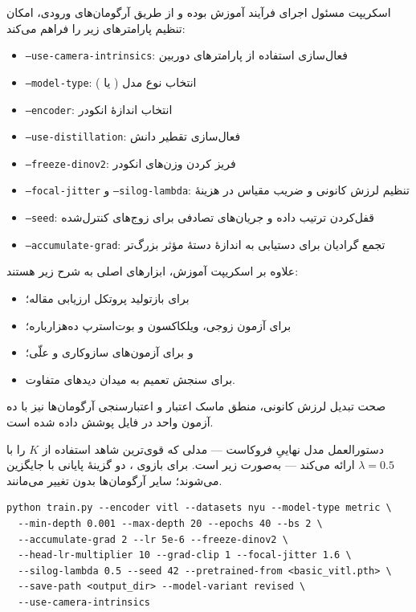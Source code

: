 اسکریپت  مسئول اجرای فرآیند آموزش بوده و از طریق آرگومان‌های ورودی، امکان تنظیم پارامترهای زیر را فراهم می‌کند:

\begin{itemize}
    \item \texttt{--use-camera-intrinsics}: فعال‌سازی استفاده از پارامترهای دوربین
    \item \texttt{--model-type}: انتخاب نوع مدل ( یا )
    \item \texttt{--encoder}: انتخاب اندازهٔ انکودر 
    \item \texttt{--use-distillation}: فعال‌سازی تقطیر دانش
    \item \texttt{--freeze-dinov2}: فریز کردن وزن‌های انکودر
    \item \texttt{--focal-jitter} و \texttt{--silog-lambda}: تنظیم لرزش کانونی و ضریب مقیاس در هزینهٔ 
    \item \texttt{--seed}: قفل‌کردن ترتیب داده و جریان‌های تصادفی برای زوج‌های کنترل‌شده
    \item \texttt{--accumulate-grad}: تجمع گرادیان برای دستیابی به اندازهٔ دستهٔ مؤثر بزرگ‌تر
\end{itemize}

علاوه بر اسکریپت آموزش، ابزارهای اصلی به شرح زیر هستند:
\begin{itemize}
    \item {} برای بازتولید پروتکل ارزیابی مقاله؛
    \item {} برای آزمون زوجی، ویلکاکسون و بوت‌استرپ ده‌هزارباره؛
    \item {} و  برای آزمون‌های سازوکاری و علّی؛
    \item {} برای سنجش تعمیم به میدان دیدهای متفاوت.
\end{itemize}
صحت تبدیل لرزش کانونی، منطق ماسک اعتبار و اعتبارسنجی آرگومان‌ها نیز با ده آزمون واحد در فایل
پوشش داده شده است.

دستورالعمل مدل نهاییِ فروکاست --- مدلی که قوی‌ترین شاهد استفاده از $K$ را با $\lambda=0.5$ ارائه می‌کند --- به‌صورت زیر است. برای بازوی \controlmodel{}، دو گزینهٔ پایانی با  جایگزین می‌شوند؛ سایر آرگومان‌ها بدون تغییر می‌مانند.

\begin{latin}
\small
\begin{verbatim}
python train.py --encoder vitl --datasets nyu --model-type metric \
  --min-depth 0.001 --max-depth 20 --epochs 40 --bs 2 \
  --accumulate-grad 2 --lr 5e-6 --freeze-dinov2 \
  --head-lr-multiplier 10 --grad-clip 1 --focal-jitter 1.6 \
  --silog-lambda 0.5 --seed 42 --pretrained-from <basic_vitl.pth> \
  --save-path <output_dir> --model-variant revised \
  --use-camera-intrinsics
\end{verbatim}
\end{latin}

